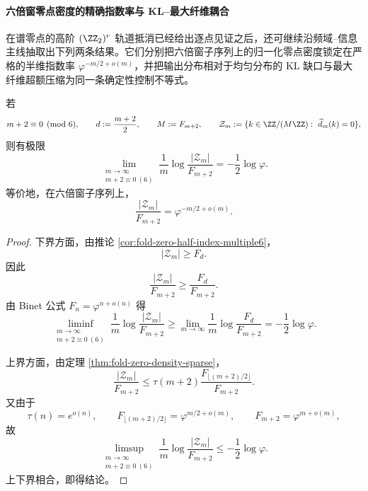 \paragraph{六倍窗零点密度的精确指数率与 KL--最大纤维耦合}
在谱零点的高阶 \texorpdfstring{$(\ZZ_2)^r$}{(Z2)r} 轨道抵消已经给出逐点见证之后，还可继续沿频域--信息主线抽取出下列两条结果。它们分别把六倍窗子序列上的归一化零点密度锁定在严格的半维指数率 \(\varphi^{-m/2+o(m)}\)，并把输出分布相对于均匀分布的 KL 缺口与最大纤维超额压缩为同一条确定性控制不等式。

\begin{theorem}[六倍窗上的零点密度具有精确指数率]\label{thm:xi-time-part70c-zero-density-exact-ratio-exponent-multiple6}
若
\[
m+2\equiv 0\pmod 6,
\qquad
d:=\frac{m+2}{2},
\qquad
M:=F_{m+2},
\qquad
\mathcal Z_m:=\{k\in \ZZ/(M\ZZ):\ \widehat d_m(k)=0\},
\]
则有极限
\[
\lim_{\substack{m\to\infty\\ m+2\equiv 0\ (6)}}
\frac1m\log\frac{|\mathcal Z_m|}{F_{m+2}}
=
-\frac12\log\varphi.
\]
等价地，在六倍窗子序列上，
\[
\frac{|\mathcal Z_m|}{F_{m+2}}
=
\varphi^{-m/2+o(m)}.
\]
\end{theorem}
\begin{proof}
下界方面，由推论 \ref{cor:fold-zero-half-index-multiple6}，
\[
|\mathcal Z_m|
\ge
F_d.
\]
因此
\[
\frac{|\mathcal Z_m|}{F_{m+2}}
\ge
\frac{F_d}{F_{m+2}}.
\]
由 Binet 公式 \(F_n=\varphi^{n+o(n)}\) 得
\[
\liminf_{\substack{m\to\infty\\ m+2\equiv 0\ (6)}}
\frac1m\log\frac{|\mathcal Z_m|}{F_{m+2}}
\ge
\lim_{m\to\infty}
\frac1m\log\frac{F_d}{F_{m+2}}
=
-\frac12\log\varphi.
\]

上界方面，由定理 \ref{thm:fold-zero-density-sparse}，
\[
\frac{|\mathcal Z_m|}{F_{m+2}}
\le
\tau(m+2)\frac{F_{\lfloor (m+2)/2\rfloor}}{F_{m+2}}.
\]
又由于
\[
\tau(n)=e^{o(n)},
\qquad
F_{\lfloor (m+2)/2\rfloor}= \varphi^{m/2+o(m)},
\qquad
F_{m+2}=\varphi^{m+o(m)},
\]
故
\[
\limsup_{\substack{m\to\infty\\ m+2\equiv 0\ (6)}}
\frac1m\log\frac{|\mathcal Z_m|}{F_{m+2}}
\le
-\frac12\log\varphi.
\]
上下界相合，即得结论。
\end{proof}

